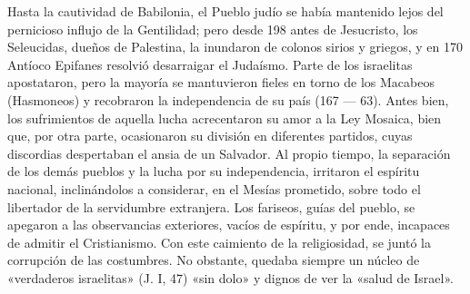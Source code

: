 \raggedbottom{} \documentclass[12pt, a4paper]{book}
\begin{document}
Hasta la cautividad de Babilonia, el Pueblo judío se había mantenido lejos del pernicioso influjo de la Gentilidad; pero desde 198 antes de Jesucristo, los Seleucidas, dueños de Palestina, la inundaron de colonos sirios y griegos, y en 170 Antíoco Epifanes resolvió desarraigar el Judaísmo. Parte de los israelitas apostataron, pero la mayoría se mantuvieron fieles en torno de los Macabeos (Hasmoneos) y recobraron la independencia de su país (167 --- 63). Antes bien, los sufrimientos de aquella lucha acrecentaron su amor a la Ley Mosaica, bien que, por otra parte, ocasionaron su división en diferentes partidos, cuyas discordias despertaban el ansia de un Salvador. Al propio tiempo, la separación de los demás pueblos y la lucha por su independencia, irritaron el espíritu nacional, inclinándolos a considerar, en el Mesías prometido, sobre todo el libertador de la servidumbre extranjera. Los fariseos, guías del pueblo, se apegaron a las observancias exteriores, vacíos de espíritu, y por ende, incapaces de admitir el Cristianismo. Con este caimiento de la religiosidad, se juntó la corrupción de las costumbres. No obstante, quedaba siempre un núcleo de «verdaderos israelitas» (J. I, 47) «sin dolo» y dignos de ver la «salud de Israel».
\end{document}
